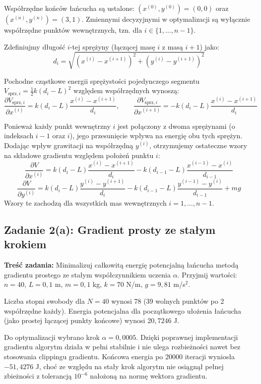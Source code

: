 \documentclass[12pt, a4paper]{article}
\begin{document}
Współrzędne końców łańcucha są ustalone: $(x^{(0)}, y^{(0)}) = (0, 0)$ oraz $(x^{(n)}, y^{(n)}) = (3, 1)$. Zmiennymi decyzyjnymi w optymalizacji są wyłącznie współrzędne punktów wewnętrznych, tzn. dla $i \in \{1, \dots, n-1\}$.

Zdefiniujmy długość $i$-tej sprężyny (łączącej masę $i$ z masą $i+1$) jako:
\[
  d_i = \sqrt{(x^{(i)} - x^{(i+1)})^2 + (y^{(i)} - y^{(i+1)})^2}
\]

Pochodne cząstkowe energii sprężystości pojedynczego segmentu $V_{\text{sprz}, i} = \frac{1}{2}k(d_i - L)^2$ względem współrzędnych wynoszą:
\[
  \frac{\partial V_{\text{sprz}, i}}{\partial x^{(i)}} = k(d_i - L) \frac{x^{(i)} - x^{(i+1)}}{d_i}, \qquad \frac{\partial V_{\text{sprz}, i}}{\partial x^{(i+1)}} = -k(d_i - L) \frac{x^{(i)} - x^{(i+1)}}{d_i}
\]

Ponieważ każdy punkt wewnętrzny $i$ jest połączony z dwoma sprężynami (o indeksach $i-1$ oraz $i$), jego przesunięcie wpływa na energię obu tych sprężyn. Dodając wpływ grawitacji na współrzędną $y^{(i)}$, otrzymujemy ostateczne wzory na składowe gradientu względem położeń punktu $i$:
\[
  \frac{\partial V}{\partial x^{(i)}} = k(d_i - L) \frac{x^{(i)} - x^{(i+1)}}{d_i} - k(d_{i-1} - L) \frac{x^{(i-1)} - x^{(i)}}{d_{i-1}}
\]
\[
  \frac{\partial V}{\partial y^{(i)}} = k(d_i - L) \frac{y^{(i)} - y^{(i+1)}}{d_i} - k(d_{i-1} - L) \frac{y^{(i-1)} - y^{(i)}}{d_{i-1}} + m g
\]
Wzory te zachodzą dla wszystkich mas wewnętrznych $i = 1, \dots, n-1$.

\subsection{Zadanie 2(a): Gradient prosty ze stałym krokiem}

\textbf{Treść zadania:} Minimalizuj całkowitą energię potencjalną łańcucha metodą gradientu prostego ze stałym współczynnikiem uczenia $\alpha$. Przyjmij wartości: $n = 40$, $L = 0{,}1$ m, $m = 0{,}1$ kg, $k = 70$ N/m, $g = 9{,}81$ m/s$^2$.

Liczba stopni swobody dla $N=40$ wynosi 78 (39 wolnych punktów po 2 współrzędne każdy). Energia potencjalna dla początkowego ułożenia łańcucha (jako prostej łączącej punkty końcowe) wynosi $20{,}7246$ J.

Do optymalizacji wybrano krok $\alpha = 0{,}0005$. Dzięki poprawnej implementacji gradientu algorytm działa w pełni stabilnie i nie ulega rozbieżności nawet bez stosowania clippingu gradientu. Końcowa energia po 20000 iteracji wyniosła $-51{,}4276$ J, choć ze względu na stały krok algorytm nie osiągnął pełnej zbieżności z tolerancją $10^{-6}$ nałożoną na normę wektora gradientu.
\end{document}
